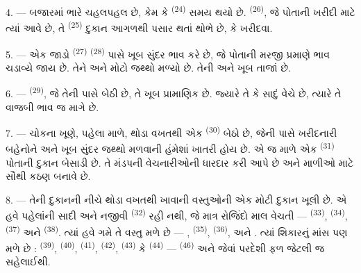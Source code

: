 \VUsaut{4.0mm}
\VUsaut{3.0mm}

4. --- બજારમાં ભારે ચહલપહલ છે, કેમ કે 
\textsuperscript{(24)} સમય થયો છે. 
\textsuperscript{(26)}, જે પોતાની ખરીદી માટે ત્યાં આવે છે, તે
 \textsuperscript{(25)} દુકાન આગળથી
પસાર થતાં થોભે છે,  કે  ખરીદવા.

5. --- એક જાડો  \textsuperscript{(27)}  \textsuperscript{(28)} પાસે ખૂબ સુંદર 
ભાવ કરે છે, જે પોતાની મરજી પ્રમાણે ભાવ ચડાવ્યે જાય છે. તેને
 અને  મોટો જથ્થો મળ્યો
છે. તેની  અને  ખૂબ તાજાં છે.

\VUsaut{4.0mm}
\VUsaut{3.0mm}

6. ---  \textsuperscript{(29)}, જે તેની
પાસે બેઠી છે, તે ખૂબ પ્રામાણિક છે. જ્યારે તે  કે સાદું  વેચે છે, ત્યારે તે વાજબી ભાવ જ
માગે છે.

7. --- ચોકના ખૂણે, પહેલા માળે, થોડા વખતથી એક 
\textsuperscript{(30)} બેઠો છે, જેની પાસે ખરીદનારી બહેનોને
 અને  ખૂબ
સુંદર જથ્થો મળવાની હંમેશાં ખાતરી હોય છે. એ જ માળે એક
 \textsuperscript{(31)} પોતાની દુકાન બેસાડી છે. તે
મંડપની વેચનારીઓની  ધારદાર કરી આપે છે અને માળીઓ માટે સૌથી
કઠણ   બનાવે છે.

\VUsaut{4.0mm}
\VUsaut{3.0mm}

8. --- તેની દુકાનની નીચે થોડા વખતથી ખાવાની વસ્તુઓની એક મોટી દુકાન
ખૂલી છે. એ હવે પહેલાંની સાદી અને નજીવી 
\textsuperscript{(32)} રહી નથી, જે માત્ર રોજિંદો માલ વેચતી —
 \textsuperscript{(33)}, 
\textsuperscript{(34)},  \textsuperscript{(37)}
અને  \textsuperscript{(38)}. ત્યાં હવે ગમે તે વસ્તુ મળે
છે — , 
\textsuperscript{(35)},  \textsuperscript{(36)},
 અને
. ત્યાં શિકારનું માંસ પણ મળે છે :  \textsuperscript{(39)}, 
\textsuperscript{(40)},  \textsuperscript{(41)},
 \textsuperscript{(42)}, 
\textsuperscript{(43)} કે  \textsuperscript{(44)} —
 \textsuperscript{(46)} અને  જેવાં પરદેશી
ફળ જેટલી જ સહેલાઈથી.

